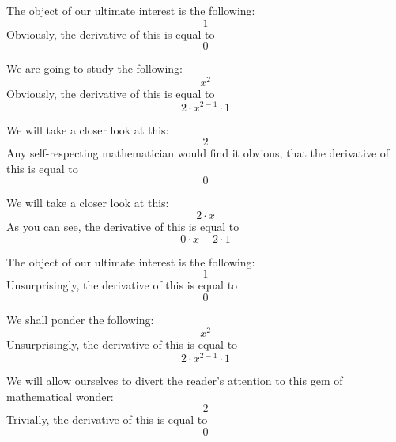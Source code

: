 \documentclass{article}
\begin{document}
The object of our ultimate interest is the following:
\begin{equation}
1 
\end{equation}
Obviously, the derivative of this is equal to
\begin{equation}
0 
\end{equation}

We are going to study the following:
\begin{equation}
x ^{2 } 
\end{equation}
Obviously, the derivative of this is equal to
\begin{equation}
2 \cdot x ^{2 - 1 } \cdot 1 
\end{equation}

We will take a closer look at this:
\begin{equation}
2 
\end{equation}
Any self-respecting mathematician would find it obvious, that the derivative of this is equal to
\begin{equation}
0 
\end{equation}

We will take a closer look at this:
\begin{equation}
2 \cdot x 
\end{equation}
As you can see, the derivative of this is equal to
\begin{equation}
0 \cdot x + 2 \cdot 1 
\end{equation}

The object of our ultimate interest is the following:
\begin{equation}
1 
\end{equation}
Unsurprisingly, the derivative of this is equal to
\begin{equation}
0 
\end{equation}

We shall ponder the following:
\begin{equation}
x ^{2 } 
\end{equation}
Unsurprisingly, the derivative of this is equal to
\begin{equation}
2 \cdot x ^{2 - 1 } \cdot 1 
\end{equation}

We will allow ourselves to divert the reader's attention to this gem of mathematical wonder:
\begin{equation}
2 
\end{equation}
Trivially, the derivative of this is equal to
\begin{equation}
0 
\end{equation}
\end{document}
